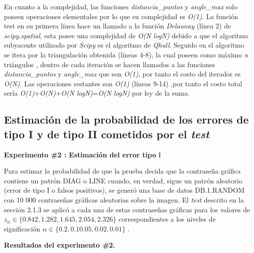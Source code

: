 \documentclass[12pt]{report}
\begin{document}
En cuanto a la complejidad, las funciones \textit{distancia\_puntos} y \textit{angle\_max} solo poseen operaciones elementales por lo que su complejidad es \textit{O(1)}. La función test en su primera línea hace un llamado a la función  \textit{Delaunay} (línea 2) de \textit{scipy.spatial}, esta posee una complejidad de \textit{O(N logN)} debido a que el algoritmo subyacente utilizado por \textit{Scipy} es el algoritmo de \textit{Qhull}. Seguido en el algoritmo se itera por la triangulación obtenida (líneas 4-8), la cual poseen como máximo \textit{n} triángulos , dentro de cada iteración se hacen llamados a las  funciones \textit{distancia\_puntos} y \textit{angle\_max}  que son \textit{O(1)}, por tanto el costo del iterador es \textit{O(N)}. Las operaciones restantes son \textit{O(1)} (líneas 9-14) ,por tanto el costo total sería \textit{O(1)}+\textit{O(N)}+\textit{O(N logN)}=\textit{O(N logN)} por ley de la suma.
\subsection{Estimación de la probabilidad de los errores de tipo I y de tipo II  cometidos por el \textit{test}}	 
	\textbf{Experimento \#2 : Estimación del error tipo} I
	
	Para estimar la probabilidad de que la prueba decida que la contraseña gráfica contiene un patrón DIAG o LINE cuando, en verdad, sigue un patrón aleatorio (error de tipo I o falsos positivos), se generó una base de datos DB.1.RANDOM con 10 000 contraseñas gráficas aleatorias sobre la imagen. El \textit{test} descrito en la sección 2.1.3 se aplicó a cada una de estas contraseñas gráficas para los valores de $z_\alpha \in \{0.842, 1.282, 1.645, 2.054, 2.326\}$ correspondientes a los niveles de significación $\alpha \in \{0.2, 0.1 0.05, 0.02 , 0.01\}$ .
	


\textbf{Resultados del experimento \#2.}
\end{document}
